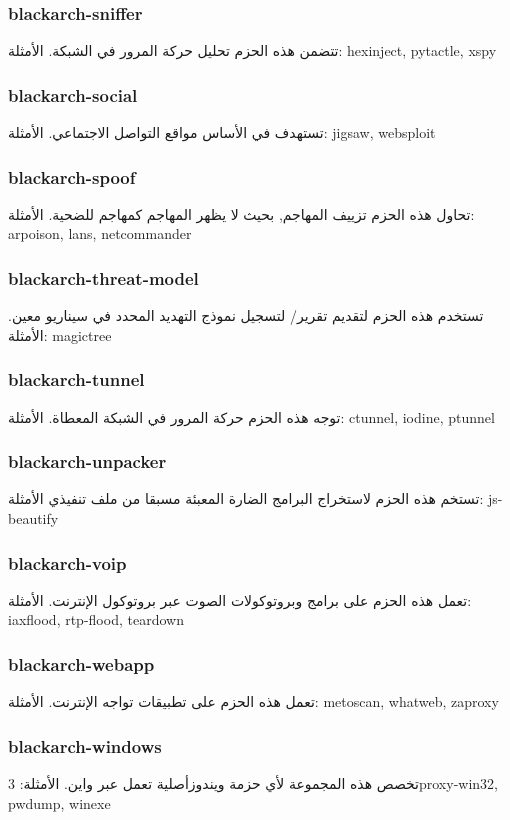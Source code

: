 \documentclass[a4paper, oneside, 11pt]{book}
\begin{document}
\subsubsection{blackarch-sniffer}
تتضمن هذه الحزم تحليل حركة المرور في الشبكة.
الأمثلة: hexinject, pytactle, xspy

\subsubsection{blackarch-social}
تستهدف في الأساس مواقع التواصل الاجتماعي.
الأمثلة: jigsaw, websploit

\subsubsection{blackarch-spoof}
تحاول هذه الحزم تزييف المهاجم, بحيث لا يظهر المهاجم كمهاجم للضحية.
الأمثلة: arpoison, lans, netcommander

\subsubsection{blackarch-threat-model}
تستخدم هذه الحزم لتقديم تقرير/ لتسجيل نموذج التهديد المحدد في سيناريو معين.
الأمثلة: magictree

\subsubsection{blackarch-tunnel}
توجه هذه الحزم حركة المرور في الشبكة المعطاة.
الأمثلة: ctunnel, iodine, ptunnel

\subsubsection{blackarch-unpacker}
تستخم هذه الحزم لاستخراج البرامج الضارة المعبئة مسبقا من ملف تنفيذي
الأمثلة: js-beautify


\subsubsection{blackarch-voip}
تعمل هذه الحزم على برامج وبروتوكولات الصوت عبر بروتوكول الإنترنت.
الأمثلة: iaxflood, rtp-flood, teardown


\subsubsection{blackarch-webapp}
تعمل هذه الحزم على تطبيقات تواجه الإنترنت.
الأمثلة: metoscan, whatweb, zaproxy

\subsubsection{blackarch-windows}
تخصص هذه المجموعة لأي حزمة ويندوزأصلية تعمل عبر واين.
الأمثلة: 3proxy-win32, pwdump, winexe
\end{document}

